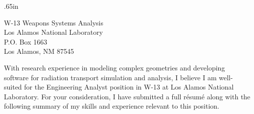 
\begin{center}
\begin{minipage}{\textwidth}

  \normalsize

	\vspace{2mm}
  
  \begingroup
  \leftskip.65in
  \rightskip\leftskip

W-13 Weapons Systems Analysis\\
Los Alamos National Laboratory \\
P.O. Box 1663 \\
Los Alamos, NM 87545
  
  \vspace{4mm} 

With research experience in modeling complex geometries and developing
software for radiation transport simulation and analysis, I believe I am
well-suited for the Engineering Analyst position in W-13
at Los Alamos National Laboratory.
For your consideration, I have submitted a full r\'{e}sum\'{e} along with
the following summary of my skills and
experience relevant to this position. \\


\begin{itemize}[leftmargin=.875in,rightmargin=.875in,itemsep=1.0mm]


\end{itemize}
\end{minipage}
\end{center}
